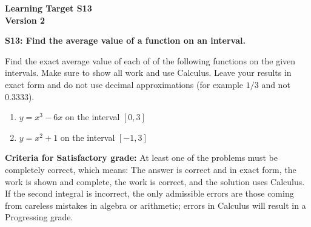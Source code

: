 \documentclass[10pt]{article}
\begin{document}
	\vspace*{0in}

		\begin{center}
			\textbf{Learning Target S13 \\
			Version 2} 
		\end{center}


\begin{framed}
	\textbf{S13: Find the average value of a function on an interval.}
\end{framed}

Find the exact average value of each of of the following functions on the given intervals. Make sure to show all work and use Calculus. Leave your results in exact form and do not use decimal approximations (for example $1/3$ and not $0.3333$). 

\begin{enumerate}
    \item $y = x^3 - 6x$ on the interval $[0,3]$
    \item $y = x^2 + 1$ on the interval $[-1,3]$
\end{enumerate}

\vfill


\begin{small}
    \begin{framed}
        	\textbf{Criteria for Satisfactory grade:} At least one of the problems must be completely correct, which means: The answer is correct and in exact form, the work is shown and complete, the work is correct, and the solution uses Calculus. If the second  integral is incorrect, the only admissible errors are those coming from careless mistakes in algebra or arithmetic; errors in Calculus will result in a Progressing grade. 
    \end{framed}

\end{small}
\end{document}
